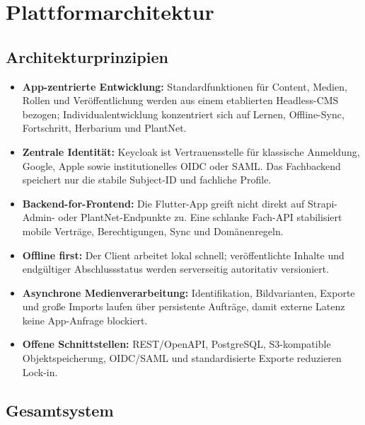 \documentclass[10pt,a4paper,oneside]{article}
\begin{document}
\section{Plattformarchitektur}\label{sec:architecture}

\subsection{Architekturprinzipien}

\begin{itemize}
  \item \textbf{App-zentrierte Entwicklung:} Standardfunktionen für Content, Medien, Rollen und Veröffentlichung werden aus einem etablierten Headless-CMS bezogen; Individualentwicklung konzentriert sich auf Lernen, Offline-Sync, Fortschritt, Herbarium und PlantNet.
  \item \textbf{Zentrale Identität:} Keycloak ist Vertrauensstelle für klassische Anmeldung, Google, Apple sowie institutionelles OIDC oder SAML. Das Fachbackend speichert nur die stabile Subject-ID und fachliche Profile.
  \item \textbf{Backend-for-Frontend:} Die Flutter-App greift nicht direkt auf Strapi-Admin- oder PlantNet-Endpunkte zu. Eine schlanke Fach-API stabilisiert mobile Verträge, Berechtigungen, Sync und Domänenregeln.
  \item \textbf{Offline first:} Der Client arbeitet lokal schnell; veröffentlichte Inhalte und endgültiger Abschlussstatus werden serverseitig autoritativ versioniert.
  \item \textbf{Asynchrone Medienverarbeitung:} Identifikation, Bildvarianten, Exporte und große Imports laufen über persistente Aufträge, damit externe Latenz keine App-Anfrage blockiert.
  \item \textbf{Offene Schnittstellen:} REST/OpenAPI, PostgreSQL, S3-kompatible Objektspeicherung, OIDC/SAML und standardisierte Exporte reduzieren Lock-in.
\end{itemize}

\subsection{Gesamtsystem}
\end{document}
